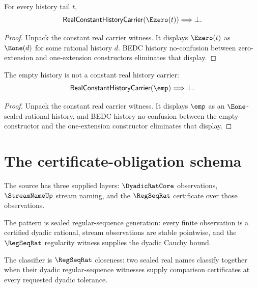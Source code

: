 \begin{theorem}
\label{thm:real-constant-history-carrier-e0-absurd}
For every history tail $t$,
$$
\mathsf{RealConstantHistoryCarrier}(\Ezero(t))
\Longrightarrow
\bot.
$$
\end{theorem}
\begin{proof}
Unpack the constant real carrier witness. It displays $\Ezero(t)$ as
$\Eone(d)$ for some rational history $d$. BEDC history no-confusion between
zero-extension and one-extension constructors eliminates that display.
\end{proof}

\begin{theorem}
\label{thm:real-constant-history-carrier-empty-absurd}
The empty history is not a constant real history carrier:
$$
\mathsf{RealConstantHistoryCarrier}(\emp)
\Longrightarrow
\bot.
$$
\end{theorem}
\begin{proof}
Unpack the constant real carrier witness. It displays $\emp$ as an
$\Eone$-sealed rational history, and BEDC history no-confusion between the
empty constructor and the one-extension constructor eliminates that display.
\end{proof}

\section{The certificate-obligation schema}

\begin{definition}
\label{def:real-source-specification}
The source has three supplied layers: $\DyadicRatCore$ observations, $\StreamNameUp$ stream naming, and the $\RegSeqRat$ certificate over those observations.
\end{definition}

\begin{definition}
\label{def:real-pattern-specification}
The pattern is sealed regular-sequence generation: every finite observation is a certified dyadic rational, stream observations are stable pointwise, and the $\RegSeqRat$ regularity witness supplies the dyadic Cauchy bound.
\end{definition}

\begin{definition}
\label{def:real-classifier-specification}
The classifier is $\RegSeqRat$ closeness: two sealed real names classify together when their dyadic regular-sequence witnesses supply comparison certificates at every requested dyadic tolerance.
\end{definition}

